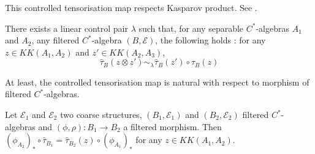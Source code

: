 This controlled tensorisation map respects Kasparov product. See \cite{OY2}.

\begin{thm}
There exists a linear control pair $\lambda$ such that, for any separable $C^*$-algebras $A_1$ and $A_2$, any filtered $C^*$-algebra $(B,\mathcal E)$, the following holds : for any $z\in KK(A_1,A_2)$ and $z'\in KK(A_2,A_3)$,
\[\hat\tau_B(z\otimes z')\sim_\lambda \hat\tau_B(z')\circ\hat\tau_B(z)\]
\end{thm}

At least, the controlled tensorisation map is natural with respect to morphism of filtered $C^*$-algebras. \cite{OY2}

\begin{prop}
Let $\mathcal E_1$ and $\mathcal E_2$ two coarse structures, $(B_1,\mathcal E_1)$ and $(B_2,\mathcal E_2)$ filtered $C^*$-algebras and $(\phi,\rho) :B_1\rightarrow B_2 $ a filtered morphism. Then $ (\phi_{A_2})_*\circ \hat \tau_{B_1}=\hat \tau_{B_2}(z)\circ(\phi_{A_1})_* $ for any $z\in KK(A_1,A_2)$.
\end{prop}




















